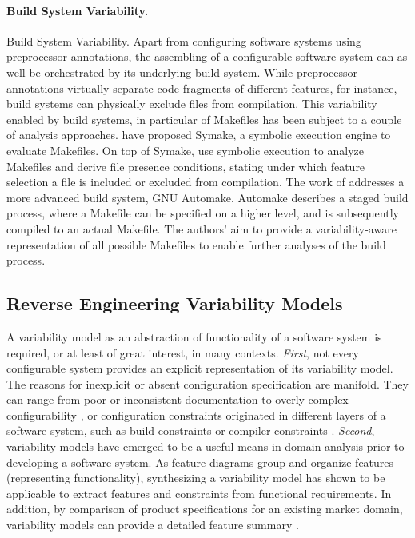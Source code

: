 \paragraph{Build System Variability.} Build System Variability. Apart from
configuring software systems using preprocessor annotations, the assembling of
a configurable software system can as well be orchestrated by its underlying
build system. While preprocessor annotations virtually separate code fragments
of different features, for instance, build systems can physically exclude files
from compilation. This variability enabled by build systems, in particular of
Makefiles has been subject to a couple of analysis approaches. \cite{tamrawi_build_2012} have
proposed Symake, a symbolic execution engine to evaluate Makefiles.
On top of Symake, \cite{zhou_extracting_2015} use symbolic execution to analyze
Makefiles and derive file presence conditions, stating under which feature
selection a file is included or excluded from compilation. The work of
\cite{al-kofahi_escaping_2016} addresses a more advanced build system, GNU Automake.
Automake describes a staged build process, where a Makefile can be specified on
a higher level, and is subsequently compiled to an actual Makefile. The
authors’ aim to provide a variability-aware representation of all possible
Makefiles to enable further analyses of the build process.

\subsection{Reverse Engineering Variability Models}
\label{sec:feature_model_synthesis} A variability model as an abstraction of
functionality of a software system is required, or at least of great interest,
in many contexts.
\emph{First}, not every configurable system provides an explicit
representation of its variability model. 
The reasons for inexplicit or absent configuration specification are manifold.
They can range from poor or inconsistent documentation
\citep{rabkin_static_2011} to overly complex configurability
\citep{xu_hey_2015}, or configuration constraints originated in different layers of a software
system, such as build constraints  or compiler constraints
\citep{nadi_where_2015}.
\emph{Second}, variability models have emerged to be a useful means in domain
analysis prior to developing a software system. As feature diagrams group and
organize features (representing functionality), synthesizing a variability model
has shown to be applicable to extract features and constraints from functional requirements.
In addition, by comparison of product specifications for an
existing market domain, variability models can provide a detailed feature
summary \citep{alves_exploratory_2008,bakar_feature_2015}.

